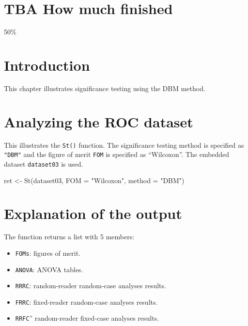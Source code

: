 \documentclass[
]{book}
\newenvironment{Shaded}{\begin{snugshade}}{\end{snugshade}}
\newcommand{\AttributeTok}[1]{\textcolor[rgb]{0.77,0.63,0.00}{#1}}
\newcommand{\FunctionTok}[1]{\textcolor[rgb]{0.00,0.00,0.00}{#1}}
\newcommand{\NormalTok}[1]{#1}
\newcommand{\OtherTok}[1]{\textcolor[rgb]{0.56,0.35,0.01}{#1}}
\newcommand{\StringTok}[1]{\textcolor[rgb]{0.31,0.60,0.02}{#1}}
\providecommand{\tightlist}{%
  \setlength{\itemsep}{0pt}\setlength{\parskip}{0pt}}
\begin{document}
\hypertarget{quick-start-dbm-text-how-much-finished}{%
\section{TBA How much finished}\label{quick-start-dbm-text-how-much-finished}}

50\%

\hypertarget{quick-start-dbm-text-intro}{%
\section{Introduction}\label{quick-start-dbm-text-intro}}

This chapter illustrates significance testing using the DBM method.

\hypertarget{quick-start-dbm-text-analyze-dataset}{%
\section{Analyzing the ROC dataset}\label{quick-start-dbm-text-analyze-dataset}}

This illustrates the \texttt{St()} function. The significance testing method is specified as \texttt{"DBM"} and the figure of merit \texttt{FOM} is specified as ``Wilcoxon''. The embedded dataset \texttt{dataset03} is used.

\begin{Shaded}
\begin{Highlighting}[]
\NormalTok{ret }\OtherTok{\textless{}{-}} \FunctionTok{St}\NormalTok{(dataset03, }\AttributeTok{FOM =} \StringTok{"Wilcoxon"}\NormalTok{, }\AttributeTok{method =} \StringTok{"DBM"}\NormalTok{)}
\end{Highlighting}
\end{Shaded}

\hypertarget{quick-start-dbm-text-explanation}{%
\section{Explanation of the output}\label{quick-start-dbm-text-explanation}}

The function returns a list with 5 members:

\begin{itemize}
\tightlist
\item
  \texttt{FOMs}: figures of merit.
\item
  \texttt{ANOVA}: ANOVA tables.
\item
  \texttt{RRRC}: random-reader random-case analyses results.
\item
  \texttt{FRRC}: fixed-reader random-case analyses results.
\item
  \texttt{RRFC}'' random-reader fixed-case analyses results.
\end{itemize}
\end{document}
